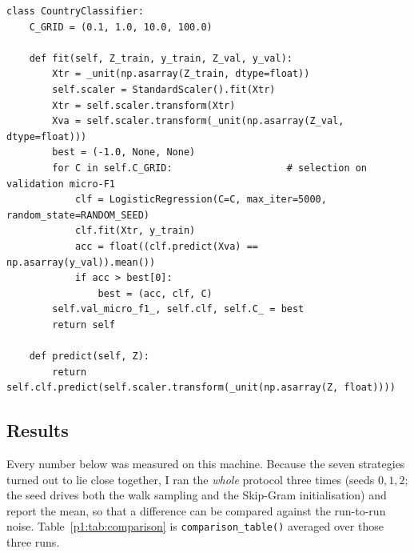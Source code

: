 \begin{lstlisting}[style=p1code,caption={TODO 3b --- \texttt{CountryClassifier}}]
class CountryClassifier:
    C_GRID = (0.1, 1.0, 10.0, 100.0)

    def fit(self, Z_train, y_train, Z_val, y_val):
        Xtr = _unit(np.asarray(Z_train, dtype=float))
        self.scaler = StandardScaler().fit(Xtr)
        Xtr = self.scaler.transform(Xtr)
        Xva = self.scaler.transform(_unit(np.asarray(Z_val, dtype=float)))
        best = (-1.0, None, None)
        for C in self.C_GRID:                    # selection on validation micro-F1
            clf = LogisticRegression(C=C, max_iter=5000, random_state=RANDOM_SEED)
            clf.fit(Xtr, y_train)
            acc = float((clf.predict(Xva) == np.asarray(y_val)).mean())
            if acc > best[0]:
                best = (acc, clf, C)
        self.val_micro_f1_, self.clf, self.C_ = best
        return self

    def predict(self, Z):
        return self.clf.predict(self.scaler.transform(_unit(np.asarray(Z, float))))
\end{lstlisting}

\subsection{Results}
\label{p1:sec:results}

Every number below was measured on this machine.  Because the seven strategies turned out
to lie close together, I ran the \emph{whole} protocol three times (seeds $0,1,2$; the
seed drives both the walk sampling and the Skip-Gram initialisation) and report the mean,
so that a difference can be compared against the run-to-run noise.  Table~\ref{p1:tab:comparison}
is \texttt{comparison\_table()} averaged over those three runs.

